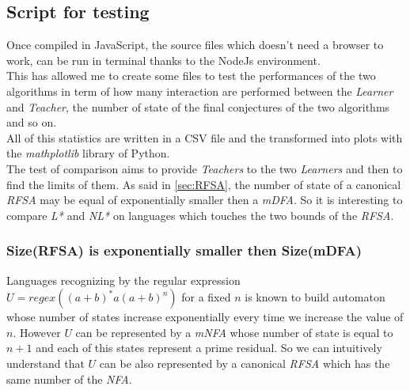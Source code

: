 \subsection{Script for testing}
Once compiled in JavaScript, the source files which doesn't need a browser to work, can be run in terminal thanks to the NodeJs environment. \\
This has allowed me to create some files to test the performances of the two algorithms in term of how many interaction are performed between the \textit{Learner} and \textit{Teacher}, the number of state of the final conjectures of the two algorithms and so on. \\
All of this statistics are written in a CSV file and the transformed into plots with the \textit{mathplotlib} library of Python.\\
The test of comparison aims to provide \textit{Teachers} to the two \textit{Learners} and then to find the limits of them. As said in \cref{sec:RFSA}, the number of state of a canonical \textit{RFSA} may be equal of exponentially smaller then a \textit{mDFA}. So it is interesting to compare \textit{L*} and \textit{NL*} on languages which touches the two bounds of the \textit{RFSA}.


\subsubsection{Size(RFSA) is exponentially smaller then Size(mDFA)}
Languages recognizing by the regular expression $U = regex((a+b)^*a(a+b)^n)$ for a fixed $n$ is known to build automaton whose number of states increase exponentially every time we increase the value of $n$. However $U$ can be represented by a \textit{mNFA} whose number of state is equal to $n+1$ and each of this states represent a prime residual. So we can intuitively understand that $U$ can be also represented by a canonical \textit{RFSA} which has the same number of the \textit{NFA}.

